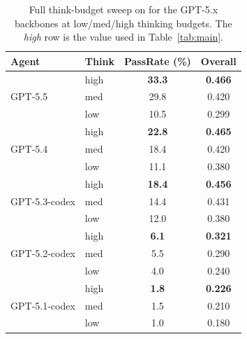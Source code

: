 \begin{table}[!htbp]
\centering
\footnotesize
\setlength{\tabcolsep}{8pt}
\renewcommand{\arraystretch}{1.1}
\caption{Full think-budget sweep on \Eyeson{} for the GPT-5.x backbones at low/med/high thinking budgets. The \emph{high} row is the value used in Table~\ref{tab:main}.}
\label{tab:main-full}
\begin{tabular}{l l cc}
\toprule
\textbf{Agent} & \textbf{Think} & \textbf{PassRate} (\%) & \textbf{Overall} \\
\midrule
\multirow{3}{*}{GPT-5.5}
& high & \textbf{33.3} & \textbf{0.466} \\
& med  & 29.8          & 0.420 \\
& low  & 10.5          & 0.299 \\
\midrule
\multirow{3}{*}{GPT-5.4}
& high & \textbf{22.8} & \textbf{0.465} \\
& med  & 18.4          & 0.420 \\
& low  & 11.1          & 0.380 \\
\midrule
\multirow{3}{*}{GPT-5.3-codex}
& high & \textbf{18.4} & \textbf{0.456} \\
& med  & 14.4          & 0.431 \\
& low  & 12.0          & 0.380 \\
\midrule
\multirow{3}{*}{GPT-5.2-codex}
& high & \textbf{6.1}  & \textbf{0.321} \\
& med  &  5.5          & 0.290 \\
& low  &  4.0          & 0.240 \\
\midrule
\multirow{3}{*}{GPT-5.1-codex}
& high & \textbf{1.8}  & \textbf{0.226} \\
& med  &  1.5          & 0.210 \\
& low  &  1.0          & 0.180 \\
\bottomrule
\end{tabular}
\end{table}








